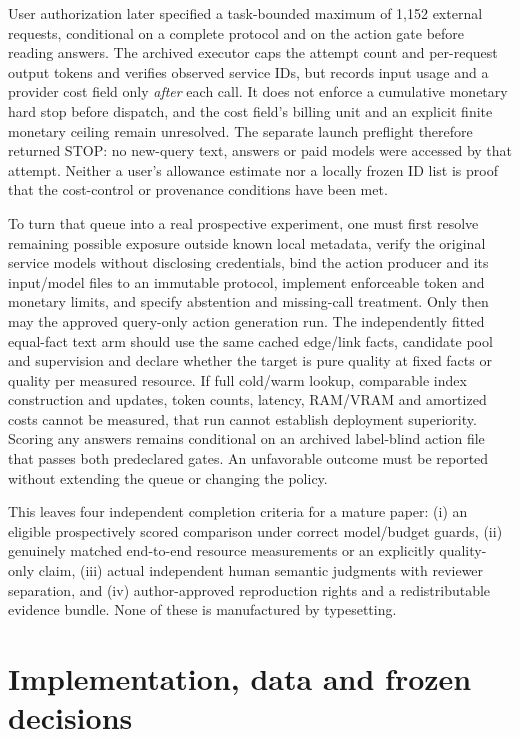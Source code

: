 User authorization later specified a task-bounded maximum of 1,152
external requests, conditional on a complete protocol and on the
action gate before reading answers. The archived executor caps the
attempt count and per-request output tokens and verifies observed
service IDs, but records input usage and a provider cost field only
\emph{after} each call. It does not enforce a cumulative monetary
hard stop before dispatch, and the cost field's billing unit and an
explicit finite monetary ceiling remain unresolved. The separate
launch preflight therefore returned STOP: no new-query text, answers
or paid models were accessed by that attempt. Neither a user's
allowance estimate nor a locally frozen ID list is proof that the
cost-control or provenance conditions have been met.

To turn that queue into a real prospective experiment, one must
first resolve remaining possible exposure outside known local
metadata, verify the original service models without disclosing
credentials, bind the action producer and its input/model files to
an immutable protocol, implement enforceable token and monetary
limits, and specify abstention and missing-call treatment. Only
then may the approved query-only action generation run. The
independently fitted equal-fact text arm should use the same cached
edge/link facts, candidate pool and supervision and declare whether
the target is pure quality at fixed facts or quality per measured
resource. If full cold/warm lookup, comparable index construction
and updates, token counts, latency, RAM/VRAM and amortized costs
cannot be measured, that run cannot establish deployment superiority.
Scoring any answers remains conditional on an archived label-blind
action file that passes both predeclared gates. An unfavorable outcome
must be reported without extending the queue or changing the policy.

This leaves four independent completion criteria for a mature paper:
(i) an eligible prospectively scored comparison under correct
model/budget guards, (ii) genuinely matched end-to-end resource
measurements or an explicitly quality-only claim, (iii) actual
independent human semantic judgments with reviewer separation, and
(iv) author-approved reproduction rights and a redistributable
evidence bundle. None of these is manufactured by typesetting.

 \section{Implementation, data and frozen decisions}\label{app:implementation}
